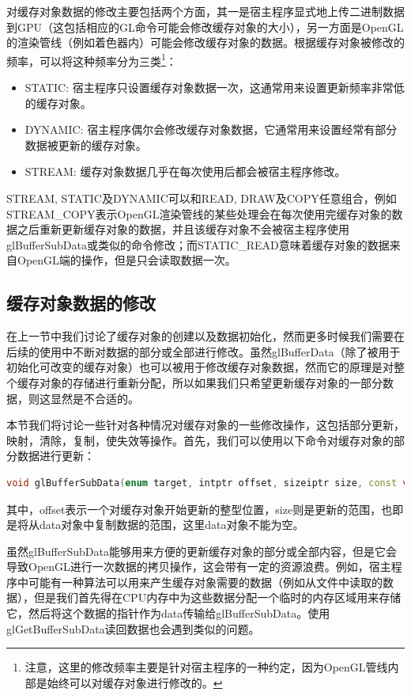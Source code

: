 对缓存对象数据的修改主要包括两个方面，其一是宿主程序显式地上传二进制数据到GPU（这包括相应的GL命令可能会修改缓存对象的大小），另一方面是OpenGL的渲染管线（例如着色器内）可能会修改缓存对象的数据。根据缓存对象被修改的频率，可以将这种频率分为三类\footnote{注意，这里的修改频率主要是针对宿主程序的一种约定，因为OpenGL管线内部是始终可以对缓存对象进行修改的。}：

\begin{itemize}
	\item STATIC: 宿主程序只设置缓存对象数据一次，这通常用来设置更新频率非常低的缓存对象。
	\item DYNAMIC: 宿主程序偶尔会修改缓存对象数据，它通常用来设置经常有部分数据被更新的缓存对象。
	\item STREAM: 缓存对象数据几乎在每次使用后都会被宿主程序修改。
\end{itemize}

STREAM, STATIC及DYNAMIC可以和READ, DRAW及COPY任意组合，例如STREAM\_COPY表示OpenGL渲染管线的某些处理会在每次使用完缓存对象的数据之后重新更新缓存对象的数据，并且该缓存对象不会被宿主程序使用glBufferSubData​或类似的命令修改；而STATIC\_READ意味着缓存对象的数据来自OpenGL端的操作，但是只会读取数据一次。 




\subsection{缓存对象数据的修改}
在上一节中我们讨论了缓存对象的创建以及数据初始化，然而更多时候我们需要在后续的使用中不断对数据的部分或全部进行修改。虽然glBufferData（除了被用于初始化可改变的缓存对象）也可以被用于修改缓存对象数据，然而它的原理是对整个缓存对象的存储进行重新分配，所以如果我们只希望更新缓存对象的一部分数据，则这显然是不合适的。

本节我们将讨论一些针对各种情况对缓存对象的一些修改操作，这包括部分更新，映射，清除，复制，使失效等操作。首先，我们可以使用以下命令对缓存对象的部分数据进行更新：

\begin{lstlisting}[language=C++]
void glBufferSubData​(enum target, intptr offset, sizeiptr size, const void *data)
\end{lstlisting}

其中，offset表示一个对缓存对象开始更新的整型位置，size则是更新的范围，也即是将从data对象中复制数据的范围，这里data对象不能为空。

虽然glBufferSubData能够用来方便的更新缓存对象的部分或全部内容，但是它会导致OpenGL进行一次数据的拷贝操作，这会带有一定的资源浪费。例如，宿主程序中可能有一种算法可以用来产生缓存对象需要的数据（例如从文件中读取的数据），但是我们首先得在CPU内存中为这些数据分配一个临时的内存区域用来存储它，然后将这个数据的指针作为data传输给glBufferSubData。使用glGetBufferSubData读回数据也会遇到类似的问题。

